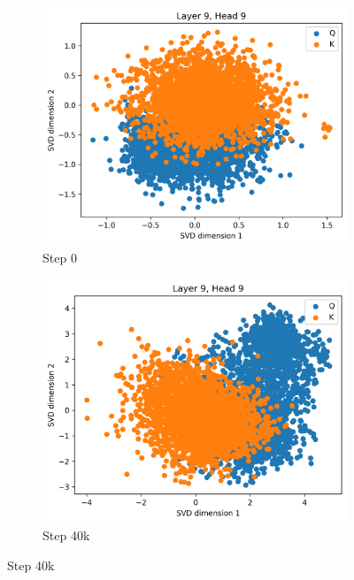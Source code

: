\begin{appendices}
\begin{figure}[ht]
    \centering
    \begin{subfigure}[b]{0.24\linewidth}
         \includegraphics[width=\linewidth]{sources/part_1/anisotropy/imgs/dist_l9h9_s0_Q.png}
         \caption{Step 0}
         \label{fig:dist_qk_s0_Q}
    \end{subfigure}
    \begin{subfigure}[b]{0.24\linewidth}
         \includegraphics[width=\linewidth]{sources/part_1/anisotropy/imgs/dist_l9h9_s40_Q.png}
         \caption{Step 40k}
         \label{fig:dist_qk_s40_Q}
    \end{subfigure}

\end{figure}
\end{appendices}
